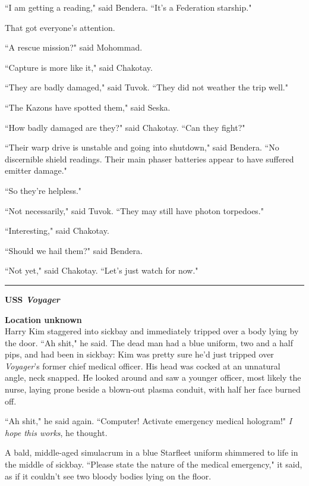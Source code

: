 \documentclass[twoside,letterpaper,12pt]{memoir}
\begin{document}
``I am getting a reading," said Bendera. ``It's a Federation starship."

That got everyone's attention.

``A rescue mission?" said Mohommad.

``Capture is more like it," said Chakotay.

``They are badly damaged," said Tuvok. ``They did not weather the trip well."

``The Kazons have spotted them," said Seska.

``How badly damaged are they?" said Chakotay. ``Can they fight?"

``Their warp drive is unstable and going into shutdown," said Bendera. ``No discernible shield readings. Their main phaser batteries appear to have suffered emitter damage."

``So they're helpless."

``Not necessarily," said Tuvok. ``They may still have photon torpedoes."

``Interesting," said Chakotay.

``Should we hail them?" said Bendera.

``Not yet," said Chakotay. ``Let's just watch for now."

\begin{center}\rule{3cm}{0.4 pt}\end{center}

\noindent\textbf{USS \textit{Voyager}}

\noindent\textbf{Location unknown}\\

Harry Kim staggered into sickbay and immediately tripped over a body lying by the door. ``Ah shit," he said. The dead man had a blue uniform, two and a half pips, and had been in sickbay: Kim was pretty sure he'd just tripped over \textit{Voyager}'s former chief medical officer. His head was cocked at an unnatural angle, neck snapped. He looked around and saw a younger officer, most likely the nurse, laying prone beside a blown-out plasma conduit, with half her face burned off.

``Ah shit," he said again. ``Computer! Activate emergency medical hologram!" \textit{I hope this works}, he thought.

A bald, middle-aged simulacrum in a blue Starfleet uniform shimmered to life in the middle of sickbay. ``Please state the nature of the medical emergency," it said, as if it couldn't see two bloody bodies lying on the floor.
\end{document}
